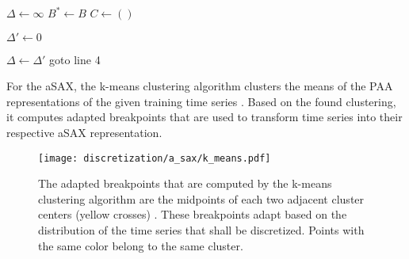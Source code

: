 \begin{center}
\begin{algorithm}[H]
  \SetAlgoLined
  \LinesNumbered
  \DontPrintSemicolon
  
  $\Delta \leftarrow \infty$ \;
  $B^* \leftarrow B$\;
  $C \leftarrow ()$ \; 
  
  \For{$i \leftarrow 0$ \KwTo $k-1$}{
  	$b_{i} \leftarrow [ \beta_i, \beta_{i+1} )$ \tcp*[f]{$\beta_i, \beta_{i+1} \in B^*$}\;
    $n_i \leftarrow \sum_{\overline{x} \in b_i} 1$ \tcp*[f]{number of all $\overline{x} \in DB_{Tr}$ in cluster $b_i$}\;
    $s_i \leftarrow$ $\sum_{\overline{x} \in b_i} \overline{x}$ \tcp*[f]{sum of all $\overline{x} \in DB_{Tr}$ in cluster $b_i$}\;
    $c_i \leftarrow \frac{1}{n_i} s_i$ \tcp*[f]{cluster center of the $i$th cluster}\;
    $C(i) \leftarrow c_i$\;
  }
  
  
  $\Delta' \leftarrow 0$ \;
  \For{$i \leftarrow 1$ \KwTo $k$}{
    $b_{i} \leftarrow [ \beta_i, \beta_{i+1} )$ \tcp*[f]{$\beta_i, \beta_{i+1} \in B^*$}\;
    $e_i \leftarrow \sum_{\overline{x} \in b_i} (\overline{x} - c_i)^2$ \tcp*[f]{training error in cluster $b_i$, $c_i \in C$}\;
  	$\Delta' \leftarrow \Delta' \ + \ e_i$\;
  }
  
   {
    $\Delta \leftarrow \Delta'$\;
    goto line 4 \;
  }
  
  \caption[Adaptive Symbolic Aggregate Approximation - k-means]{For the \ac{aSAX}, the k-means clustering algorithm clusters the means of the \ac{PAA} representations of the given training time series \cite{A_SAX}. Based on the found clustering, it computes adapted breakpoints that are used to transform time series into their respective \ac{aSAX} representation.}
  \label{alg:A_SAX_k_means}
\end{algorithm}
\end{center}
\begin{figure}[htb]
\centering
\texttt{[image: discretization/a\_sax/k\_means.pdf]}
\caption[Adaptive Symbolic Aggregate Approximation - Adapted Breakpoints]{The adapted breakpoints that are computed by the k-means clustering algorithm are the midpoints of each two adjacent cluster centers (yellow crosses) \cite{A_SAX}. These breakpoints adapt based on the distribution of the time series that shall be discretized. Points with the same color belong to the same cluster.}
\label{fig:k_means}
\end{figure}
